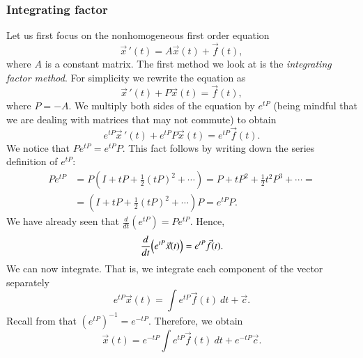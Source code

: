 \documentclass[12pt]{book}
\begin{document}
\subsubsection{Integrating factor}

Let us first focus on the nonhomogeneous first order equation
\begin{equation*}
{\vec{x}\,}'(t) = A\vec{x}(t) + \vec{f}(t) ,
\end{equation*}
where $A$ is a constant matrix.  The first method we look at is the
\emph{integrating factor method}.
For simplicity we rewrite the equation as
\begin{equation*}
{\vec{x}\,}'(t) + P \vec{x}(t) = \vec{f}(t) ,
\end{equation*}
where $P = -A$.
We multiply both sides of the
equation by $e^{tP}$ (being mindful that we are dealing with matrices that
may not commute) to obtain
\begin{equation*}
e^{tP}{\vec{x}\,}'(t) + e^{tP}P\vec{x}(t) = e^{tP}\vec{f}(t) .
\end{equation*}
We notice that $P e^{tP} = e^{tP} P$.  This fact follows by writing
down the series definition of $e^{tP}$:
\begin{equation*}
\begin{split}
P e^{tP} & = 
P \left(
I + tP + \frac{1}{2} {(tP)}^2 + \cdots \right)
=
P + tP^2 + \frac{1}{2} t^2P^3 + \cdots
=
\\
& =
\left(
I + tP + \frac{1}{2} {(tP)}^2 + \cdots \right) P 
= e^{tP} P . 
\end{split}
\end{equation*}
We have already seen that $\frac{d}{dt} \left( e^{tP} \right)
= P e^{tP}$.  Hence,
\begin{equation*}
\frac{d}{dt}
\Bigl( e^{tP} \vec{x}(t) \Bigr) = e^{tP}\vec{f}(t) .
\end{equation*}
We can now integrate.  That is, we integrate each component of the vector
separately
\begin{equation*}
e^{tP} \vec{x}(t) = \int e^{tP}\vec{f}(t) ~ dt + \vec{c} .
\end{equation*}
Recall from  that ${(e^{tP})}^{-1} = e^{-tP}$.
Therefore, we obtain
\begin{equation*}
\vec{x}(t) = e^{-tP} \int e^{tP}\vec{f}(t) ~ dt + e^{-tP} \vec{c} .
\end{equation*}
\end{document}
